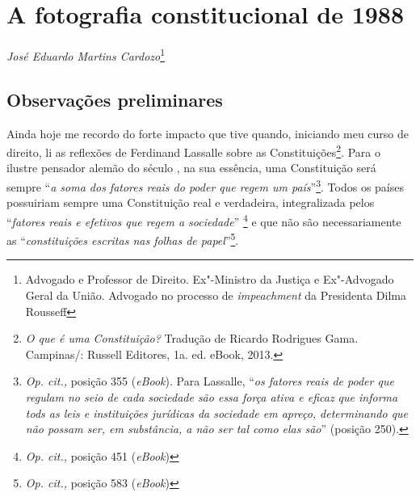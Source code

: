 \chapter*{A fotografia constitucional de 1988}


\emph{José Eduardo Martins Cardozo}\footnote{Advogado e
Professor de Direito. Ex"-Ministro da Justiça e Ex"-Advogado
Geral da União. Advogado no processo de \emph{impeachment} da Presidenta
Dilma Rousseff}

\section{Observações preliminares}

Ainda hoje me recordo do forte impacto que tive quando, iniciando meu
curso de direito, li as reflexões de Ferdinand Lassalle sobre as
Constituições\footnote{\emph{O que é uma Constituição?} Tradução de
  Ricardo Rodrigues Gama. Campinas/: Russell Editores, 1a. ed. eBook,
  2013.}. Para o ilustre pensador alemão do século , na sua essência,
uma Constituição será sempre ``\emph{a soma dos fatores reais do poder
que regem um país}''\footnote{\emph{Op. cit.,} posição 355
  (\emph{eBook}). Para Lassalle, ``\emph{os fatores reais de poder que
  regulam no seio de cada sociedade são essa força ativa e eficaz que
  informa tods as leis e instituições jurídicas da sociedade em apreço,
  determinando que não possam ser, em substância, a não ser tal como
  elas são}'' (posição 250).}. Todos os países possuiriam sempre uma
Constituição real e verdadeira, integralizada pelos ``\emph{fatores
reais e efetivos que regem a sociedade}'' \footnote{\emph{Op. cit.,}
  posição 451 (\emph{eBook})} e que não são necessariamente as
``\emph{constituições escritas nas folhas de papel}''\footnote{\emph{Op.
  cit.,} posição 583 (\emph{eBook})}.

